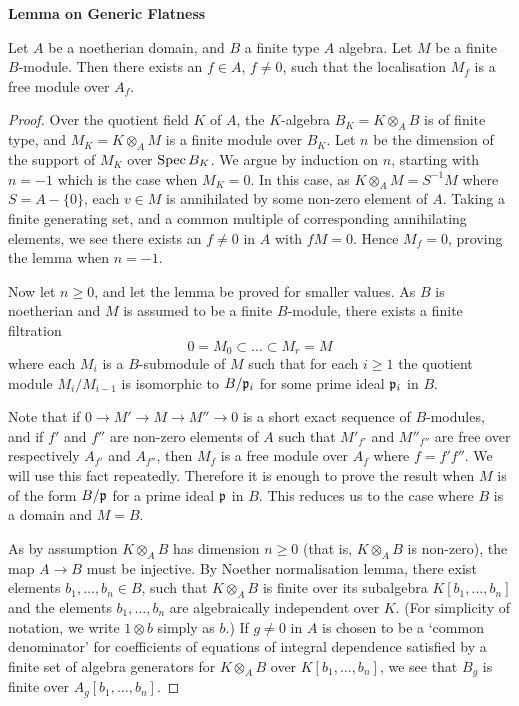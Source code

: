 



\medskip


\centerline{\large\bf Lemma on Generic Flatness}

\medskip


\begin{lemma} \label{nhq-algebraic-generic-flatness}
Let $A$ be a noetherian domain,
and $B$ a finite type $A$ algebra. Let $M$ be a finite $B$-module.
Then there exists an $f\in A$, $f\ne 0$, such that
the localisation $M_f$ is a free module over $A_f$.
\end{lemma}


\begin{proof} Over the quotient field $K$ of $A$, the $K$-algebra
$B_K = K\otimes _AB$ is of finite type, and $M_K = K\otimes_AM$ is a
finite module over $B_K$. Let $n$ be the dimension of the support
of $M_K$ over $\operatorname{Spec} B_K$. We argue by induction on $n$, starting
with $n=-1$ which is the case when $M_K =0$. In this case, as
$K\otimes _AM = S^{-1}M$ where $S = A - \{ 0\}$, each $v\in M$
is annihilated by some non-zero element of $A$. Taking a finite
generating set, and a common multiple of corresponding annihilating
elements, we see there exists an $f\ne 0$ in $A$ with $fM=0$.
Hence $M_f =0$, proving the lemma when $n=-1$.

Now let $n\ge 0$, and let the lemma be proved for smaller values.
As $B$ is noetherian and $M$ is assumed to be a finite $B$-module,
there exists a finite filtration
$$0=M_0 \subset \ldots  \subset M_r =M$$
where each $M_i$ is a $B$-submodule of $M$ such that for each $i\ge 1$
the quotient module $M_i/M_{i-1}$ is isomorphic to $B/\mathfrak p_i$ for
some prime ideal $\mathfrak p_i$ in $B$.

Note that if $0\to M'\to M\to M'' \to 0$ is a short exact
sequence of $B$-modules, and if $f'$ and $f''$ are non-zero elements of
$A$ such that $M'_{f'}$ and $M''_{f''}$ are free over
respectively $A_{f'}$ and $A_{f''}$, then $M_f$ is a free module over $A_f$
where $f=f'f''$. We will use this fact repeatedly.
Therefore it is enough to prove the result when
$M$ is of the form $B/\mathfrak p$ for a prime ideal $\mathfrak p$ in $B$.
This reduces us to the case where $B$ is a domain and $M=B$.

As by assumption $K\otimes_AB$ has dimension $n\ge 0$ (that is,
$K\otimes_AB$ is non-zero), the map $A\to B$ must be injective.
By Noether normalisation lemma, there exist elements
$b_1,\ldots,b_n \in B$,
such that $K\otimes_AB$ is finite over its subalgebra
$K[b_1,\ldots, b_n]$ and
the elements $b_1,\ldots, b_n$ are algebraically independent
over $K$. (For simplicity of notation, we write $1\otimes b$ simply as $b$.)
If $g\ne 0$ in $A$ is chosen to be a `common denominator' for
coefficients of equations of integral dependence
satisfied by a finite set of
algebra generators for $K\otimes_AB$ over $K[b_1,\ldots, b_n]$,
we see that $B_g$ is finite over $A_g[b_1,\ldots, b_n]$.


\end{proof}
